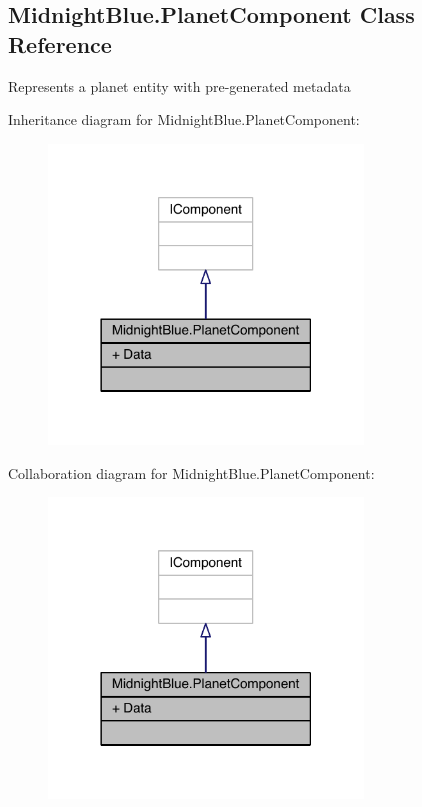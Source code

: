 \hypertarget{class_midnight_blue_1_1_planet_component}{}\subsection{Midnight\+Blue.\+Planet\+Component Class Reference}
\label{class_midnight_blue_1_1_planet_component}


Represents a planet entity with pre-\/generated metadata  




Inheritance diagram for Midnight\+Blue.\+Planet\+Component\+:\nopagebreak
\begin{figure}[H]
\begin{center}
\leavevmode
\includegraphics[width=237pt]{class_midnight_blue_1_1_planet_component__inherit__graph}
\end{center}
\end{figure}


Collaboration diagram for Midnight\+Blue.\+Planet\+Component\+:\nopagebreak
\begin{figure}[H]
\begin{center}
\leavevmode
\includegraphics[width=237pt]{class_midnight_blue_1_1_planet_component__coll__graph}
\end{center}
\end{figure}
